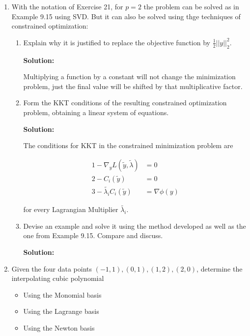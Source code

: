 \documentclass[12pt]{article}
\newcommand{\norm}[1]{\left|\left| #1 \right|\right|}
\renewcommand{\P}[1]{\left( #1 \right)}
\newcommand{\grad}{\nabla}
\begin{document}
\begin{enumerate}
\item With the notation of Exercise 21, for $p = 2$ the problem can be solved as
in Example 9.15 using SVD. But it can also be solved using thge techniques of
constrained optimization:

\begin{enumerate}
  \item Explain why it is justified to replace the objective function by $\frac{1}{2}\norm{y}_{2}^{2}$.

  {\bf Solution:}

  Multiplying a function by a constant will not change the minimization problem, just
  the final value will be shifted by that multiplicative factor.

  \item Form the KKT conditions of the resulting constrained optimization problem,
  obtaining a linear system of equations.

  {\bf Solution:}

  The conditions for KKT in the constrained minimization problem are

  \begin{align*}
    1 - \grad_{y}L\left( \widetilde{y}, \widetilde{\lambda}\right) &= 0\\
    2 - C_{i}\P{\widetilde{y}} &= 0\\
    3 - \widetilde{\lambda_{i}}C_{i}\P{\widetilde{y}} &= \grad\phi(y)
  \end{align*}

  for every Lagrangian Multiplier $\widetilde{\lambda_{i}}$.

  \item Devise an example and solve it using the method developed as well as the one
  from Example 9.15. Compare and discuss.

  {\bf Solution:}

\end{enumerate}

\item Given the four data points $(-1, 1), (0,1), (1,2), (2,0)$, determine the
interpolating cubic polynomial

\begin{itemize}
  \item Using the Monomial basis
  \item Using the Lagrange basis
  \item Using the Newton basis
\end{itemize}


\end{enumerate}
\end{document}
